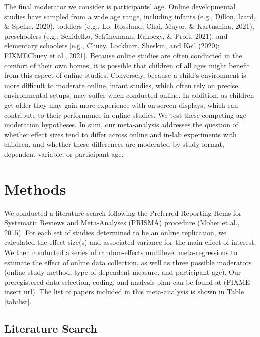 \documentclass[
  man,floatsintext]{apa6}
\begin{document}
The final moderator we consider is participants' age. Online developmental studies have sampled from a wide age range, including infants (e.g., Dillon, Izard, \& Spelke, 2020), toddlers (e.g., Lo, Rosslund, Chai, Mayor, \& Kartushina, 2021), preschoolers (e.g., Schidelko, Schünemann, Rakoczy, \& Proft, 2021), and elementary schoolers {[}e.g., Chuey, Lockhart, Sheskin, and Keil (2020); FIXMEChuey et al., 2021{]}. Because online studies are often conducted in the comfort of their own homes, it is possible that children of all ages might benefit from this aspect of online studies. Conversely, because a child's environment is more difficult to moderate online, infant studies, which often rely on precise environmental setups, may suffer when conducted online. In addition, as children get older they may gain more experience with on-screen displays, which can contribute to their performance in online studies. We test these competing age moderation hypotheses. In sum, our meta-analysis addresses the question of whether effect sizes tend to differ across online and in-lab experiments with children, and whether these differences are moderated by study format, dependent variable, or participant age.

\hypertarget{methods}{%
\section{Methods}\label{methods}}

We conducted a literature search following the Preferred Reporting Items for Systematic Reviews and Meta-Analyses (PRISMA) procedure (Moher et al., 2015). For each set of studies determined to be an online replication, we calculated the effect size(s) and associated variance for the main effect of interest. We then conducted a series of random-effects multilevel meta-regressions to estimate the effect of online data collection, as well as three possible moderators (online study method, type of dependent measure, and participant age). Our preregistered data selection, coding, and analysis plan can be found at (FIXME insert url). The list of papers included in this meta-analysis is shown in Table \ref{tab:list}.

\hypertarget{literature-search}{%
\subsection{Literature Search}\label{literature-search}}
\end{document}
